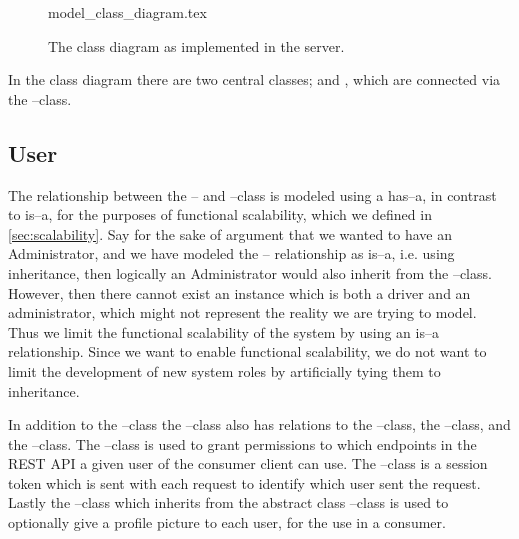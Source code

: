 \begin{figure}[p]
    \begin{center}
        {model_class_diagram.tex}
        \caption{The class diagram as implemented in the server.}\label{fig:model_class_diagram}
    \end{center}
\end{figure}

In the class diagram there are two central classes;  and , which are connected via the --class.
\subsection{User}
The relationship between the -- and --class is modeled using a has--a, in contrast to is--a, for the purposes of functional scalability, which we defined in \cref{sec:scalability}.
Say for the sake of argument that we wanted to have an Administrator, and we have modeled the -- relationship as is--a, i.e. using inheritance, 
then logically an Administrator would also inherit from the --class.
However, then there cannot exist an instance which is both a driver and an administrator, which might not represent the reality we are trying to model. 
Thus we limit the functional scalability of the system by using an is--a relationship. 
Since we want to enable functional scalability, we do not want to limit the development of new system roles by artificially tying them to inheritance.

In addition to the --class the --class also has relations to the --class, the --class, and the --class.
The --class is used to grant permissions to which endpoints in the REST API a given user of the consumer client can use.
The --class is a session token which is sent with each request to identify which user sent the request. 
Lastly the --class which inherits from the abstract class --class is used to optionally give a profile picture to each user, for the use in a consumer. 



